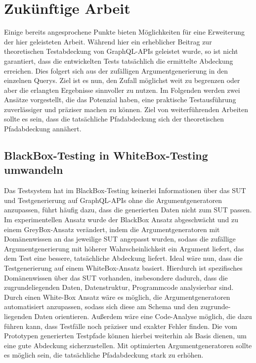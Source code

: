 \chapter{Zukünftige Arbeit}
\label{futurework}

Einige bereits angesprochene Punkte bieten Möglichkeiten für eine Erweiterung der hier geleisteten Arbeit.
Während hier ein erheblicher Beitrag zur theoretischen Testabdeckung von GraphQL-APIs geleistet wurde,
so ist nicht garantiert, dass die entwickelten Tests tatsächlich die ermittelte Abdeckung erreichen.
Dies folgert sich aus der zufälligen Argumentgenerierung in den einzelnen Querys.
Ziel ist es nun, den Zufall möglichst weit zu begrenzen oder aber die erlangten Ergebnisse sinnvoller zu nutzen.
Im Folgenden werden zwei Ansätze vorgestellt, die das Potenzial haben, eine praktische Testausführung zuverlässiger und präziser machen zu können.
Ziel von weiterführenden Arbeiten sollte es sein, dass die tatsächliche Pfadabdeckung sich der theoretischen Pfadabdeckung annähert.

\section{BlackBox-Testing in WhiteBox-Testing umwandeln}

Das Testsystem hat im BlackBox-Testing keinerlei Informationen über das SUT und Testgenerierung auf GraphQL-APIs ohne die Argumentgeneratoren anzupassen,
führt häufig dazu, dass die generierten Daten nicht zum SUT passen.
Im experimentellen Ansatz wurde der BlackBox Ansatz abgeschwächt und zu einem GreyBox-Ansatz verändert, indem die Argumentgeneratoren mit Domänenwissen an das jeweilige SUT angepasst wurden,
sodass die zufällige Argumentgenerierung mit höherer Wahrscheinlichkeit ein Argument liefert, das dem Test eine bessere, tatsächliche Abdeckung liefert.
Ideal wäre nun, dass die Testgenerierung auf einem WhiteBox-Ansatz basiert.
Hierdurch ist spezifisches Domänenwissen über das SUT vorhanden, insbesondere dadurch, dass die zugrundeliegenden Daten, Datenstruktur, Programmcode analysierbar sind.
Durch einen White-Box Ansatz wäre es möglich, die Argumentgeneratoren automatisiert anzupassen, sodass sich diese am Schema und den zugrunde-liegenden Daten orientieren.
Außerdem wäre eine Code-Analyse möglich, die dazu führen kann, dass Testfälle noch präziser und exakter Fehler finden.
Die vom Prototypen generierten Testpfade können hierbei weiterhin als Basis dienen, um eine gute Abdeckung sicherzustellen.
Mit optimierten Argumentgeneratoren sollte es möglich sein, die tatsächliche Pfadabdeckung stark zu erhöhen.

